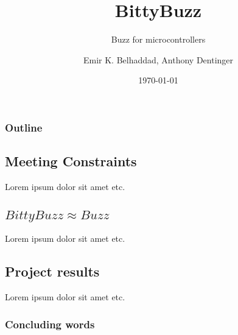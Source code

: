 \documentclass{beamer}
\title{BittyBuzz}
\subtitle{Buzz for microcontrollers}
\author{Emir K. Belhaddad, Anthony Dentinger}
\date{\today}
\begin{document}
	\begin{frame}
		\titlepage
	\end{frame}
	\begin{frame}
		\frametitle{Outline}
		\tableofcontents
	\end{frame}
	\begin{frame}
		\section{Meeting Constraints}
		Lorem ipsum dolor sit amet etc.
	\end{frame}
	\begin{frame}
		\section{$BittyBuzz \approx Buzz$}
		Lorem ipsum dolor sit amet etc.
	\end{frame}
	\begin{frame}
		\section{Project results}
		Lorem ipsum dolor sit amet etc.
	\end{frame}
	\begin{frame}
		\frametitle{Concluding words}
	\end{frame}
\end{document}
